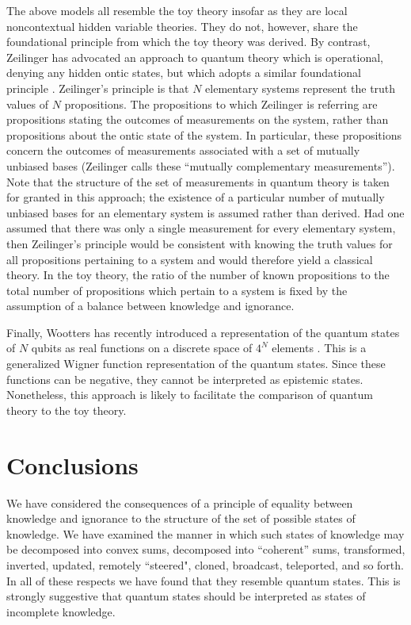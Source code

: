 \documentclass[pra,nofootinbib,showpacs,12pt]{revtex4}
\begin{document}
\strut The above models all resemble the toy theory insofar as
they are local noncontextual hidden variable theories. They do
not, however, share the foundational principle from which the toy
theory was derived. By contrast, Zeilinger has advocated an
approach to quantum theory which is operational, denying any
hidden ontic states, but which adopts a similar foundational
principle \cite{Zeilinger}. Zeilinger's principle is that $N$
elementary systems represent the truth values of $N$ propositions.
The propositions to which Zeilinger is referring are propositions
stating the outcomes of measurements on the system, rather than
propositions about the ontic state of the system. In particular,
these propositions concern the outcomes of measurements associated
with a set of mutually unbiased bases (Zeilinger calls these
``mutually complementary measurements''). Note that the structure
of the set of measurements in quantum theory is taken for granted
in this approach; the existence of a particular number of mutually
unbiased bases for an elementary system is assumed rather than
derived. Had one assumed that there was only a single measurement
for every elementary system, then Zeilinger's principle would be
consistent with knowing the truth values for all propositions
pertaining to a system and would therefore yield a classical
theory. In the toy theory, the ratio of the number of known
propositions to the total number of propositions which pertain to
a system is fixed by the assumption of a balance between knowledge
and ignorance.

Finally, Wootters has recently introduced a representation of the quantum
states of $N$ qubits as real functions on a discrete space of $4^{N}$
elements \cite{WoottersWignerfunctions}. This is a generalized Wigner
function representation of the quantum states. Since these functions can be
negative, they cannot be interpreted as epistemic states. Nonetheless, this
approach is likely to facilitate the comparison of quantum theory to the toy
theory.

\section{Conclusions}

\label{conclusions}

We have considered the consequences of a principle of equality between
knowledge and ignorance to the structure of the set of possible states of
knowledge. We have examined the manner in which such states of knowledge may
be decomposed into convex sums, decomposed into ``coherent'' sums,
transformed, inverted, updated, remotely ``steered", cloned, broadcast,
teleported, and so forth. In all of these respects we have found that they
resemble quantum states. This is strongly suggestive that quantum states
should be interpreted as states of incomplete knowledge.
\end{document}
